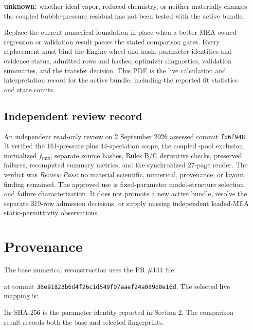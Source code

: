 \documentclass[10pt,oneside]{scrartcl}
\begin{document}
\textbf{unknown:} whether ideal vapor, reduced chemistry, or neither materially
changes the coupled bubble-pressure residual has not been tested with the
active bundle.

Replace the current numerical foundation in place when a better MEA-owned
regression or validation result passes the stated comparison gates. Every
replacement must bind the Engine wheel and hash, parameter identities and
evidence status, admitted rows and hashes, optimizer diagnostics, validation
summaries, and the transfer decision. This PDF is the live calculation and
interpretation record for the active bundle, including the reported fit
statistics and state counts.

\subsection{Independent review record}

An independent read-only review on 2 September 2026 assessed commit
\nolinkurl{fb6f948}. It verified the 161-pressure plus 44-speciation scope,
the coupled -pool exclusion, normalized $f_{\mathrm{mix}}$, separate
source hashes, Rules B/C derivative checks, preserved failures, recomputed
summary metrics, and the synchronized 27-page render. The verdict was
\emph{Review Pass}: no material scientific, numerical, provenance, or layout
finding remained. The approved use is fixed-parameter model-structure
selection and failure characterization. It does not promote a new active
bundle, resolve the separate 319-row admission decisions, or supply missing
independent loaded-MEA static-permittivity observations.

\section{Provenance}

The base numerical reconstruction uses the PR \#134 file:\par\vspace{2pt}
\par\vspace{2pt}at commit
\nolinkurl{38e91823b6d4f26c1d549f07aaef24a089d8e16d}.
The selected live mapping is:\par\vspace{2pt}
\par\vspace{2pt}Its SHA-256 is the parameter identity reported in Section 2.
The comparison result records both the base and selected fingerprints.
\end{document}
